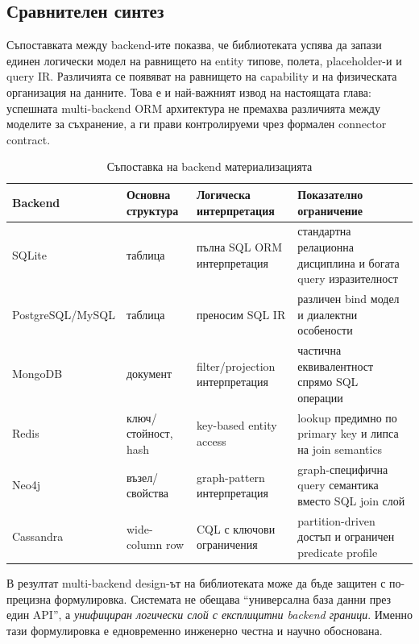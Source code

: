 \subsection{Сравнителен синтез}

Съпоставката между backend-ите показва, че библиотеката успява да запази единен логически модел на равнището на entity типове, полета, placeholder-и и query IR. Различията се появяват на равнището на capability и на физическата организация на данните. Това е и най-важният извод на настоящата глава: успешната multi-backend ORM архитектура не премахва различията между моделите за съхранение, а ги прави контролируеми чрез формален connector contract.

\begin{table}[H]
\centering
\small
\caption{Съпоставка на backend материализацията}
\label{tab:backend_materialisation}
\begin{tabularx}{\textwidth}{L{2.0cm}L{2.5cm}L{2.8cm}Y}
\toprule
\textbf{Backend} & \textbf{Основна структура} & \textbf{Логическа интерпретация} & \textbf{Показателно ограничение} \\
\midrule
SQLite & таблица & пълна SQL ORM интерпретация & стандартна релационна дисциплина и богата query изразителност \\
PostgreSQL/MySQL & таблица & преносим SQL IR & различен bind модел и диалектни особености \\
MongoDB & документ & filter/projection интерпретация & частична еквивалентност спрямо SQL операции \\
Redis & ключ/стойност, hash & key-based entity access & lookup предимно по primary key и липса на join semantics \\
Neo4j & възел/свойства & graph-pattern интерпретация & graph-специфична query семантика вместо SQL join слой \\
Cassandra & wide-column row & CQL с ключови ограничения & partition-driven достъп и ограничен predicate profile \\
\bottomrule
\end{tabularx}
\end{table}

В резултат multi-backend design-ът на библиотеката може да бъде защитен с по-прецизна формулировка. Системата не обещава ``универсална база данни през един API'', а \emph{унифициран логически слой с експлицитни backend граници}. Именно тази формулировка е едновременно инженерно честна и научно обоснована.
